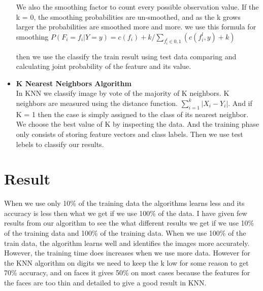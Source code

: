 \documentclass{article}
\begin{document}
\begin{itemize}
        We also the smoothing factor to count every possible observation value.  If the k = 0, the smoothing probabilities are un-smoothed, and as the k grows larger the probabilities are smoothed more and more.  we use this formula for smoothing $P(F_i=f_i|Y=y) = c(f_i) + k/ \sum_{f_{i}^l \in {0,1}} (c(f_{i}^l,y)+k) $
        
        then we use the classify the train result using test data comparing and calculating joint probability of the feature and its value.
        
        \item \textbf{K Nearest Neighbors Algorithm} \\
        \qquad In KNN we classify image by vote of the majority of K neighbors. K neighbors are measured using the distance function.  $\sum_{i=1}^k |X_i-Y_i|$.  And if K = 1 then the case is simply assigned to the class of its nearest neighbor.  We choose the best value of K by inspecting the data.  And the training phase only consists of storing feature vectors and class labels.  Then we use test lebels to classify our results. 
    \end{itemize}
    
        
        
    
        
        
\section{Result}
   
        When we use only 10\% of the training data the algorithms learns less and its accuracy is less then what we get if we use 100\% of the data.  I have given few results from our algorithm to see the what different results we get if we use 10\% of the training data and 100\% of the training data.  When we use 100\% of the train data, the algorithm learns well and identifies the images more accurately.  However, the training time does increases when we use more data.  However for the KNN algorithm on digits we need to keep the k low for some reason to get 70\% accuracy, and on faces it gives 50\% on most cases because the features for the faces are too thin and detailed to give a good result in KNN.\\
        
        
        
\end{document}
